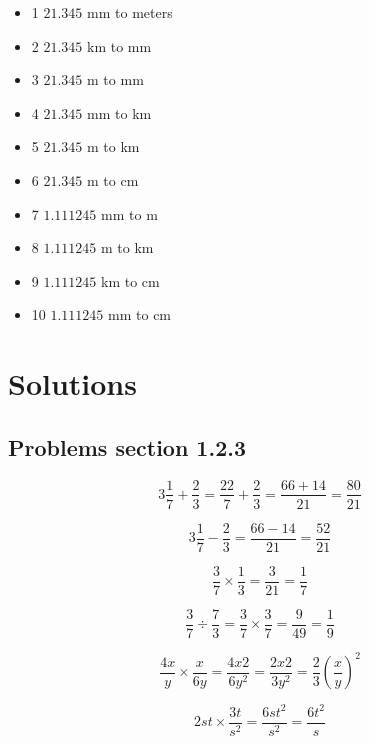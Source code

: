 \begin{itemize}
  \item 1 $21.345$ mm to meters 
  \item 2 $21.345$ km to mm
  \item 3 $21.345$ m to mm
  \item 4 $21.345$ mm to km
  \item 5 $21.345$ m to km
  \item 6 $21.345$ m to cm
  \item 7 $1.111245$ mm to m
  \item 8 $1.111245$ m to km
  \item 9 $1.111245$ km to cm
  \item 10 $1.111245$ mm to cm
\end{itemize}


\section{Solutions}

\subsection{Problems section 1.2.3}

\begin{equation}
  3\frac{1}{7} + \frac{2}{3} = \frac{22}{7} + \frac{2}{3} = \frac{66 + 14}{21} = \frac{80}{21}
\end{equation}

\begin{equation}
  3\frac{1}{7} - \frac{2}{3} = \frac{66 - 14}{21} = \frac{52}{21}
\end{equation}

\begin{equation}
  \frac{3}{7} \times \frac{1}{3} = \frac{3}{21} = \frac{1}{7}
\end{equation}

\begin{equation}
  \frac{3}{7} \div \frac{7}{3}  = \frac{3}{7} \times \frac{3}{7} = \frac{9}{49} = \frac{1}{9}
\end{equation}

\begin{equation}
  \frac{4x}{y} \times \frac{x}{6y} = \frac{4x{2}}{6y^{2}} = \frac{2x{2}}{3y^{2}} = \frac{2}{3} \left ( \frac{x}{y} \right )^{2}
\end{equation}

\begin{equation}
  2st \times \frac{3t}{s^{2}} = \frac{6st^{2}}{s^{2}} = \frac{6 t^{2}}{s}
\end{equation}

